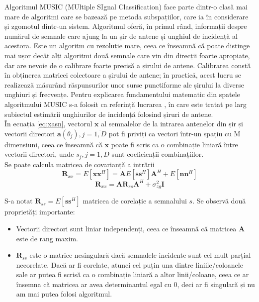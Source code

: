 Algoritmul MUSIC (MUltiple SIgnal Classification) face parte dintr-o clasă mai
mare de algoritmi care se bazează pe metoda subspațiilor, care ia în considerare
și zgomotul dintr-un sistem. Algoritmul oferă, în primul rând, informații despre
numărul de semnale care ajung la un șir de antene și unghiul de incidență al
acestora. Este un algoritm cu rezoluție mare, ceea ce înseamnă că poate distinge
mai ușor decât alți algoritmi două semnale care vin din direcții foarte
apropiate, dar are nevoie de o calibrare foarte precisă a șirului de antene.
Calibrarea constă în obținerea matricei colectoare a șirului de antene; în
practică, acest lucru se realizează măsurând răspunsurilor unor surse
punctiforme ale șirului la diverse unghiuri și frecvențe. Pentru explicarea
fundamentului matematic din spatele algoritmului MUSIC s-a folosit ca referință
lucrarea \cite{cite:doa-1996}, în care este tratat pe larg subiectul estimării
unghiurilor de incidență folosind șiruri de antene.\\

În ecuația \eqref{eq:xasn}, vectorul $\bm{x}$ al semnalelor de la intrarea
antenelor din șir și vectorii directori $\bm{a}(\theta_j), j = \overline{1, D}$
pot fi priviți ca vectori într-un spațiu cu M dimensiuni, ceea ce înseamnă că
$\bm{x}$ poate fi scris ca o combinație liniară între vectorii directori, unde $s_j,
j = \overline{1, D}$ sunt coeficienții combinațiilor. \\

Se poate calcula matricea de covarianță a intrării
\begin{equation}
    \bm{R}_{xx} = E[\bm{xx}^H] = \bm{A}E[\bm{ss}^H]\bm{A}^H + E[\bm{nn}^H]
\end{equation}
\begin{equation}
    \bm{R}_{xx} = \bm{A}\bm{R}_{ss}\bm{A}^H + \sigma^2_{zg}\bm{I}
\end{equation}

S-a notat $\bm{R}_{ss} = E[\bm{ss}^H]$ matricea de corelație a semnalului $s$.
Se observă două proprietăți importante:
\begin{itemize}
    \item Vectorii directori sunt liniar independenți, ceea ce înseamnă că
    matricea $\bm{A}$ este de rang maxim.
    \item $\bm{R}_{ss}$ este o matrice nesingulară dacă semnalele incidente sunt
    cel mult parțial necorelate. Dacă ar fi corelate, atunci cel puțin una
    dintre liniile/coloanele sale ar putea fi scrisă ca o combinație liniară a
    altor linii/coloane, ceea ce ar însemna că matricea ar avea determinantul
    egal cu 0, deci ar fi singulară și nu am mai putea folosi algoritmul.
\end{itemize}

